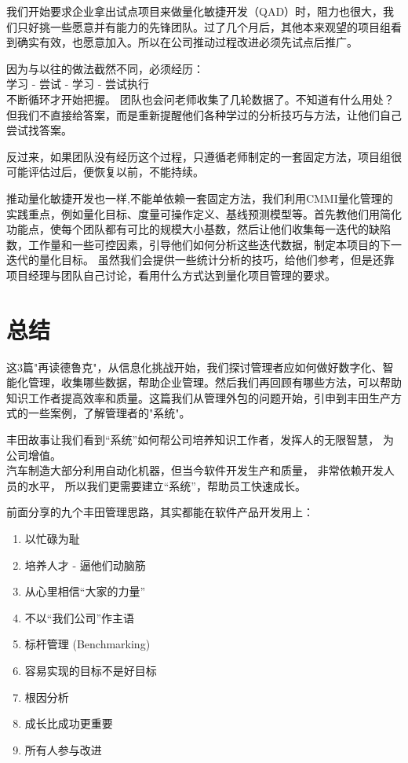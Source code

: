 我们开始要求企业拿出试点项目来做量化敏捷开发（QAD）时，阻力也很大，我们只好挑一些愿意并有能力的先锋团队。过了几个月后，其他本来观望的项目组看到确实有效，也愿意加入。所以在公司推动过程改进必须先试点后推广。

因为与以往的做法截然不同，必须经历：\\
学习 - 尝试 - 学习 - 尝试执行\\
不断循环才开始把握。 团队也会问老师收集了几轮数据了。不知道有什么用处？
但我们不直接给答案，而是重新提醒他们各种学过的分析技巧与方法，让他们自己尝试找答案。

反过来，如果团队没有经历这个过程，只遵循老师制定的一套固定方法，项目组很可能评估过后，便恢复以前，不能持续。

推动量化敏捷开发也一样,不能单依赖一套固定方法，我们利用CMMI量化管理的实践重点，例如量化目标、度量可操作定义、基线预测模型等。首先教他们用简化功能点，使每个团队都有可比的规模大小基数，然后让他们收集每一迭代的缺陷数，工作量和一些可控因素，引导他们如何分析这些迭代数据，制定本项目的下一迭代的量化目标。
虽然我们会提供一些统计分析的技巧，给他们参考，但是还靠项目经理与团队自己讨论，看用什么方式达到量化项目管理的要求。

\hypertarget{ux603bux7ed3}{%
\section{总结}\label{ux603bux7ed3}}

这3篇"再读德鲁克"，从信息化挑战开始，我们探讨管理者应如何做好数字化、智能化管理，收集哪些数据，帮助企业管理。然后我们再回顾有哪些方法，可以帮助知识工作者提高效率和质量。这篇我们从管理外包的问题开始，引申到丰田生产方式的一些案例，了解管理者的"系统"。

丰田故事让我们看到``系统''如何帮公司培养知识工作者，发挥人的无限智慧，
为公司增值。\\
汽车制造大部分利用自动化机器，但当今软件开发生产和质量，
非常依赖开发人员的水平， 所以我们更需要建立``系统''，帮助员工快速成长。

前面分享的九个丰田管理思路，其实都能在软件产品开发用上：

\begin{enumerate}
\tightlist
\item
  以忙碌为耻
\item
  培养人才 - 逼他们动脑筋
\item
  从心里相信``大家的力量''
\item
  不以``我们公司''作主语
\item
  标杆管理 (Benchmarking)
\item
  容易实现的目标不是好目标
\item
  根因分析
\item
  成长比成功更重要
\item
  所有人参与改进
\end{enumerate}


